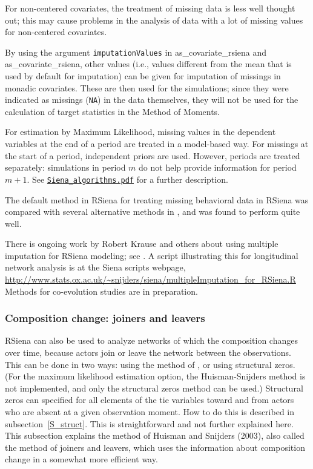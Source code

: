 \documentclass[a4paper,fleqn,11pt]{article}
\newcommand{\+}{\, + \,}
\newcommand{\sfn}[1]{\textsf{#1}}
\newcommand{\RS}{{\sf \textsf{RSiena} }}
\begin{document}
For non-centered covariates, the treatment of missing data is less
well thought out; this may cause problems in the analysis
of data with a lot of missing values for non-centered covariates.
\medskip

By using the argument \texttt{imputationValues} in \sfn{as\_covariate\_rsiena}
and \sfn{as\_covariate\_rsiena}, other values
(i.e., values different from the mean that is used by default
for imputation) can be given for imputation of missings
in monadic covariates.
These are then used for the simulations; since they were indicated as missings
(\texttt{NA}) in the data themselves, they will not be used for the calculation
of target statistics in the Method of Moments.
\medskip

For estimation by Maximum Likelihood, missing values in the dependent variables
at the end of a period are treated in a model-based way.
For missings at the start of a period, independent priors are used.
However, periods are treated separately: simulations in period $m$ do not help
provide information for period $m+1$.
See
\href{http://www.stats.ox.ac.uk/~snijders/siena/Siena_algorithms.pdf}{\texttt{Siena\_algorithms.pdf}}
for a further description.
\medskip

The default method in \RS for treating missing behavioral data in \RS was compared
with several alternative methods in \citet{ZandbergHuisman2019}, and was found to
perform quite well.

There is ongoing work by Robert Krause and others about using
multiple imputation for \RS modeling;
see \citet{KHS2018}.
A script illustrating this for longitudinal network analysis
is at the Siena scripts webpage,
\url{http://www.stats.ox.ac.uk/~snijders/siena/multipleImputation_for_RSiena.R}
Methods for co-evolution studies are in preparation.


\subsubsection{Composition change: joiners and leavers}
\label{S_comp}

\RS can also be used to analyze networks of which the composition
changes over time, because actors join or leave the network
between the observations.
This can be done in two ways: using the method of \citet{HuismanSnijders03},
or using structural zeros.
(For the maximum likelihood estimation option, the Huisman-Snijders method
is not implemented, and only the structural zeros method can be used.)
Structural zeros can specified for all elements of the tie variables
toward and from actors who are absent at a given observation moment.
How to do this is described in subsection~\ref{S_struct}.
This is straightforward and not further explained here.
This subsection explains the method of Huisman and Snijders
(2003), also called the method of joiners and leavers,
which uses the information about composition change
in a somewhat more efficient way.
\end{document}
